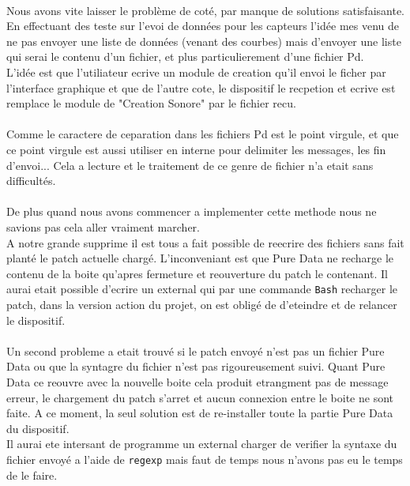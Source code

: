 \documentclass[a4paper, titlepage, oneside, 12pt]{article}%
\begin{document}
\paragraph{}
Nous avons vite laisser le problème de coté, par manque de solutions satisfaisante.\\
En effectuant des teste sur l'evoi de données pour les capteurs l'idée mes venu de ne pas envoyer une liste de données (venant des courbes) mais d'envoyer une liste qui serai le contenu d'un fichier, et plus particulierement d'une fichier Pd.\\
L'idée est que l'utiliateur ecrive un module de creation qu'il envoi le ficher par l'interface graphique et que de l'autre cote, le dispositif le recpetion et ecrive est remplace le module de "Creation Sonore" par le fichier recu.
\paragraph{}
Comme le caractere de ceparation dans les fichiers Pd est le point virgule, et que ce point virgule est aussi utiliser en interne pour delimiter les messages, les fin d'envoi... Cela a lecture et le traitement de ce genre de fichier n'a etait sans difficultés.
\paragraph{}
De plus quand nous avons commencer a implementer cette methode nous ne savions pas cela aller vraiment marcher.\\
A notre grande supprime il est tous a fait possible de reecrire des fichiers sans fait planté le patch actuelle chargé. L'inconveniant est que Pure Data ne recharge le contenu de la boite qu'apres fermeture et reouverture du patch le contenant. Il aurai etait possible d'ecrire un external qui par une commande \texttt{Bash} recharger le patch, dans la version action du projet, on est obligé de d'eteindre et de relancer le dispositif.
\paragraph{}
Un second probleme a etait trouvé si le patch envoyé n'est pas un fichier Pure Data ou que la syntagre du fichier n'est pas rigoureusement suivi. Quant Pure Data ce reouvre avec la nouvelle boite cela produit etrangment pas de message erreur, le chargement du patch s'arret et aucun connexion entre le boite ne sont faite. A ce moment, la seul solution est de re-installer toute la partie Pure Data du dispositif.\\
Il aurai ete intersant de programme un external charger de verifier la syntaxe du fichier envoyé a l'aide de \texttt{regexp} mais faut de temps nous n'avons pas eu le temps de le faire.   
\end{document}
